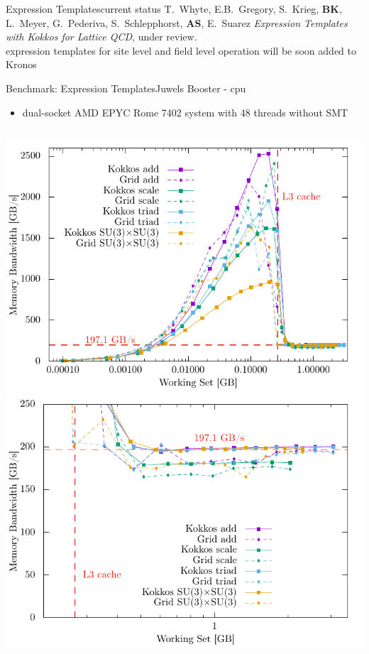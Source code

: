 \begin{frame}[fragile]{Expression Templates}{current status}
  {\footnotesize{T.~Whyte, E.B.~Gregory, S.~Krieg, \textbf{BK}, L.~Meyer, G.~Pederiva, S.~Schlepphorst, \textbf{AS}, E.~Suarez \emph{Expression Templates with Kokkos for Lattice QCD}, under review.}}\\

  expression templates for site level and field level operation will be soon added to Kronos\\

\end{frame}

\begin{frame}{Benchmark: Expression Templates}{Juwels Booster - cpu}

  \begin{itemize}
    \item dual-socket AMD EPYC Rome 7402 system with 48 threads without SMT
  \end{itemize}

  \begin{columns}
      \includegraphics[width=\textwidth]{figs/cpu_mem_bw_mixed.pdf}
      \includegraphics[width=\textwidth]{figs/cpu_mem_bw_mixed_zoom.pdf}
  \end{columns}
\end{frame}

